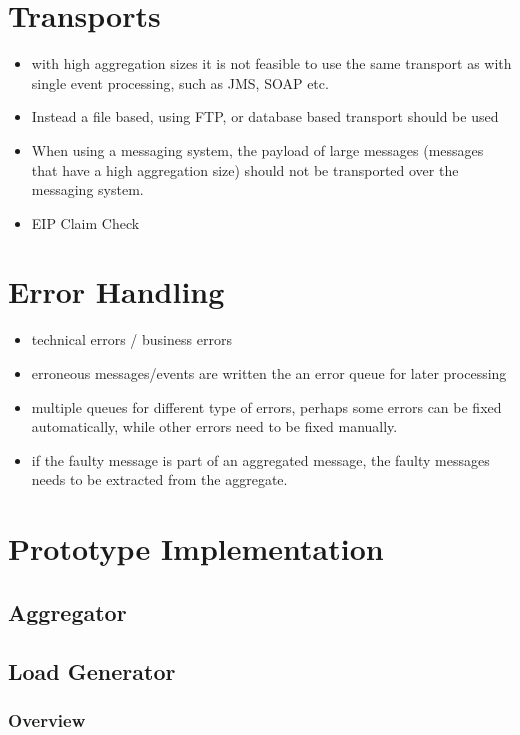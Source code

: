 \section{Transports}

\begin{itemize}
	\item with high aggregation sizes it is not feasible to use the same transport as with single event processing, such as JMS, SOAP etc.
	\item Instead a file based, using FTP, or database based transport should be used
	\item When using a messaging system, the payload of large messages (messages that have a high aggregation size) should not be transported over the messaging system. 
	\item EIP Claim Check
\end{itemize}

\section{Error Handling}

\begin{itemize}
	\item technical errors / business errors
	\item erroneous messages/events are written the an error queue for later processing
	\item multiple queues for different type of errors, perhaps some errors can be fixed automatically, while other errors need to be fixed manually.
	\item if the faulty message is part of an aggregated message, the faulty messages needs to be extracted from the aggregate.
\end{itemize}

\section{Prototype Implementation}

\subsection{Aggregator}

\subsection{Load Generator}

\subsubsection{Overview}


